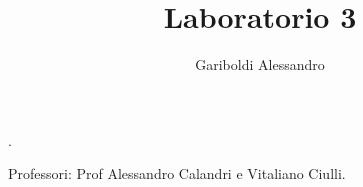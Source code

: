 \documentclass[a4paper, oneside]{article}
\title{Laboratorio 3}
\author{Gariboldi Alessandro}
\date{ }
\begin{document}
                {}          %
                {}          %
                {\slshape}  %
                {}          %
                {\bfseries} %
                {.}         %
                {\newline}         %
                {}          %
\theoremstyle{theoremEnv}

\newtheorem{definition}{Definizione}[section]
\newtheorem{theorem}{Teorema}[section]
\newtheorem{lemma}{Lemma}[section]
\newtheorem{observation}{Oss.}[section]
\newtheorem{corollary}{Corollario}[theorem]
\newtheorem{example}{Esempio}[section]
\newtheorem{problem}{Problema}[section]
\newtheorem{solution}{Soluzione}[section]
\newtheorem{proposition}{Proposizione}[section]
\maketitle

Professori: Prof Alessandro Calandri e Vitaliano Ciulli.\\\noindent
\end{document}
